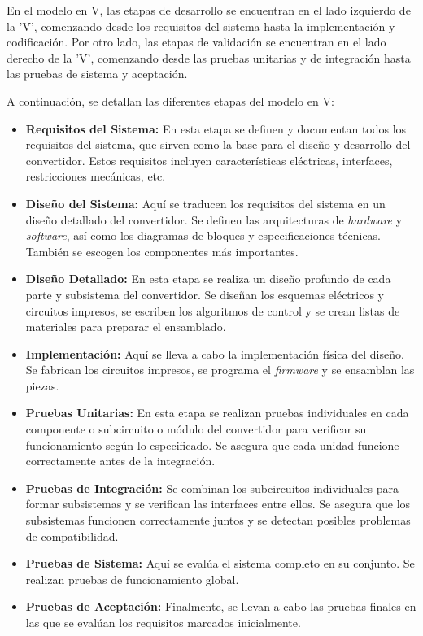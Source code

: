 En el modelo en V, las etapas de desarrollo se encuentran en el lado izquierdo de la 'V', comenzando desde los requisitos del sistema hasta la implementación y codificación. Por otro lado, las etapas de validación se encuentran en el lado derecho de la 'V', comenzando desde las pruebas unitarias y de integración hasta las pruebas de sistema y aceptación.

A continuación, se detallan las diferentes etapas del modelo en V:

\begin{itemize}
	\item \textbf{Requisitos del Sistema:} En esta etapa se definen y documentan todos los requisitos del sistema, que sirven como la base para el diseño y desarrollo del convertidor. Estos requisitos incluyen características eléctricas, interfaces, restricciones mecánicas, etc.
	
	\item \textbf{Diseño del Sistema:} Aquí se traducen los requisitos del sistema en un diseño detallado del convertidor. Se definen las arquitecturas de \textit{hardware} y \textit{software}, así como los diagramas de bloques y especificaciones técnicas. También se escogen los componentes más importantes.
	
	\item \textbf{Diseño Detallado:} En esta etapa se realiza un diseño profundo de cada parte y subsistema del convertidor. Se diseñan los esquemas eléctricos y circuitos impresos, se escriben los algoritmos de control y se crean listas de materiales para preparar el ensamblado.
	
	\item \textbf{Implementación:} Aquí se lleva a cabo la implementación física del diseño. Se fabrican los circuitos impresos, se programa el \textit{firmware} y se ensamblan las piezas.
	
	\item \textbf{Pruebas Unitarias:} En esta etapa se realizan pruebas individuales en cada componente o subcircuito o módulo del convertidor para verificar su funcionamiento según lo especificado. Se asegura que cada unidad funcione correctamente antes de la integración.
	
	\item \textbf{Pruebas de Integración:} Se combinan los subcircuitos individuales para formar subsistemas y se verifican las interfaces entre ellos. Se asegura que los subsistemas funcionen correctamente juntos y se detectan posibles problemas de compatibilidad.
	
	\item \textbf{Pruebas de Sistema:} Aquí se evalúa el sistema completo en su conjunto. Se realizan pruebas de funcionamiento global.
	
	\item \textbf{Pruebas de Aceptación:} Finalmente, se llevan a cabo las pruebas finales en las que se evalúan los requisitos marcados inicialmente.
\end{itemize}

